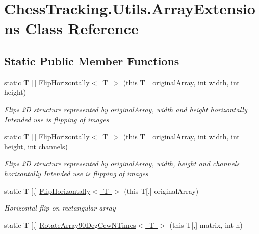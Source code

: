 \hypertarget{class_chess_tracking_1_1_utils_1_1_array_extensions}{}\section{Chess\+Tracking.\+Utils.\+Array\+Extensions Class Reference}
\label{class_chess_tracking_1_1_utils_1_1_array_extensions}
\subsection*{Static Public Member Functions}
\begin{DoxyCompactItemize}
\item 
static T \mbox{[}$\,$\mbox{]} \mbox{\hyperlink{class_chess_tracking_1_1_utils_1_1_array_extensions_a7ee8db3a5c02ab354c3f555f2105399c}{Flip\+Horizontally$<$ T $>$}} (this T\mbox{[}$\,$\mbox{]} original\+Array, int width, int height)
\begin{DoxyCompactList}\small\item\em Flips 2D structure represented by original\+Array, width and height horizontally Intended use is flipping of images \end{DoxyCompactList}\item 
static T \mbox{[}$\,$\mbox{]} \mbox{\hyperlink{class_chess_tracking_1_1_utils_1_1_array_extensions_aedd2468ee9462cdcfdce1392d69b7e3a}{Flip\+Horizontally$<$ T $>$}} (this T\mbox{[}$\,$\mbox{]} original\+Array, int width, int height, int channels)
\begin{DoxyCompactList}\small\item\em Flips 2D structure represented by original\+Array, width, height and channels horizontally Intended use is flipping of images \end{DoxyCompactList}\item 
static T \mbox{[},\mbox{]} \mbox{\hyperlink{class_chess_tracking_1_1_utils_1_1_array_extensions_a646bfd39dec184b89c70b9a6eef28ebf}{Flip\+Horizontally$<$ T $>$}} (this T\mbox{[},\mbox{]} original\+Array)
\begin{DoxyCompactList}\small\item\em Horizontal flip on rectangular array \end{DoxyCompactList}\item 
static T \mbox{[},\mbox{]} \mbox{\hyperlink{class_chess_tracking_1_1_utils_1_1_array_extensions_a0037fa8dad6fbbcb44c28d225688bbe8}{Rotate\+Array90\+Deg\+Ccw\+N\+Times$<$ T $>$}} (this T\mbox{[},\mbox{]} matrix, int n)

\end{DoxyCompactItemize}

